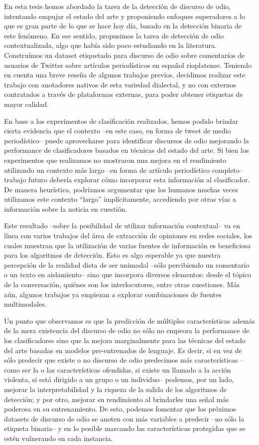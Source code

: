 En esta tesis hemos abordado la tarea de la detección de discurso de odio, intentando empujar el estado del arte y proponiendo enfoques superadores a lo que es gran parte de lo que se hace hoy día, basado en la detección binaria de este fenómeno. En ese sentido, propusimos la tarea de detección de odio contextualizada, algo que había sido poco estudiando en la literatura. Construímos un dataset etiquetado para discurso de odio sobre comentarios de usuarios de Twitter sobre artículos periodísticos en español rioplatense. Teniendo en cuenta una breve reseña de algunos trabajos previos, decidimos realizar este trabajo con anotadores nativos de esta variedad dialectal, y no con externos contratados a través de plataformas externas, para poder obtener etiquetas de mayor calidad.

En base a los experimentos de clasificación realizados, hemos podido brindar cierta evidencia que el contexto --en este caso, en forma de tweet de medio periodístico-- puede aprovecharse para identificar discursos de odio mejorando la performance de clasificadores basados en técnicas del estado del arte. Si bien los experimentos que realizamos no mostraron una mejora en el rendimiento utilizando un contexto más largo --en forma de artículo periodístico completo-- trabajo futuro debería explorar cómo incorporar esta información al clasificador. De manera heurística, podríamos argumentar que los humanos muchas veces utilizamos este contexto ``largo'' implícitamente, accediendo por otras vías a información sobre la noticia en cuestión.

Este resultado --sobre la posibilidad de utilizar información contextual-- va en línea con varios trabajos del área de extracción de opiniones en redes sociales, los cuales muestran que la utilización de varias fuentes de información es beneficiosa para los algoritmos de detección. Esto es algo esperable ya que nuestra percepción de la realidad dista de ser unimodal --sólo percibiendo un comentario o un texto en aislamiento-- sino que incorpora diversos elementos: desde el tópico de la conversación, quiénes son los interlocutores, entre otras cuestiones. Más aún, algunos trabajos ya empiezan a explorar combinaciones de fuentes multimodales.

Un punto que observamos es que la predicción de múltiples características además de la mera existencia del discurso de odio no sólo no empeora la performance de los clasificadores sino que la mejora marginalmente para las técnicas del estado del arte basadas en modelos pre-entrenados de lenguaje. Es decir, si en vez de sólo predecir que existe o no discurso de odio predecimos más características --como ser la o las características ofendidas, si existe un llamado a la acción violenta, si está dirigido a un grupo o un individuo-- podemos, por un lado, mejorar la interpretabilidad y la riqueza de la salida de los algoritmos de detección; y por otro, mejorar su rendimiento al brindarles una señal más poderosa en su entrenamiento. De esto, podemos fomentar que los próximos datasets de discurso de odio se anoten con más variables a predecir --no sólo la etiqueta binaria-- y en lo posible marcando las características protegidas que se estén vulnerando en cada instancia.


